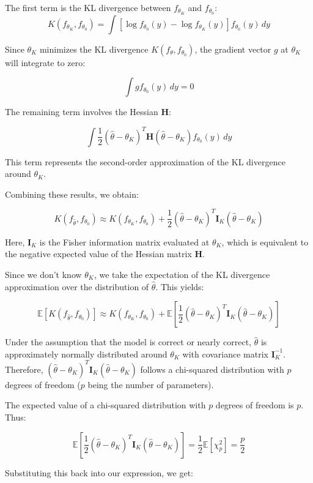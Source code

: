 \documentclass[
11pt, %
oneside, %
english, %
singlespacing, %
]{macthesis} %
\begin{document}
The first term is the KL divergence between \(f_{\theta_K}\) and \(f_{\theta_0}\):
\[
K(f_{\theta_K}, f_{\theta_0}) = \int \left[ \log{f_{\theta_0}(y)} - \log{f_{\theta_K}(y)} \right] f_{\theta_0}(y) \, dy
\]

Since \(\theta_K\) minimizes the KL divergence \(K(f_\theta, f_{\theta_0})\), the gradient vector \(g\) at \(\theta_K\) will integrate to zero:

\[
\int g f_{\theta_0}(y) \, dy = 0
\]

The remaining term involves the Hessian \(\mathbf{H}\):

\[
\int \frac{1}{2} (\hat{\theta} - \theta_K)^T \mathbf{H} (\hat{\theta} - \theta_K) f_{\theta_0}(y) \, dy
\]

This term represents the second-order approximation of the KL divergence around \(\theta_K\).

Combining these results, we obtain:

\[
K(f_{\hat{\theta}}, f_{\theta_0}) \approx K(f_{\theta_K}, f_{\theta_0}) + \frac{1}{2} (\hat{\theta} - \theta_K)^T \mathbf{I}_K (\hat{\theta} - \theta_K) 
\]

Here, \(\mathbf{I}_K\) is the Fisher information matrix evaluated at \(\theta_K\), which is equivalent to the negative expected value of the Hessian matrix \(\mathbf{H}\).

Since we don't know \(\theta_K\), we take the expectation of the KL divergence approximation over the distribution of \(\hat{\theta}\). This yields:

\[
\mathbb{E}[K(f_{\hat{\theta}}, f_{\theta_0})] \approx K(f_{\theta_K}, f_{\theta_0}) + \mathbb{E}\left[\frac{1}{2} (\hat{\theta} - \theta_K)^T \mathbf{I}_K (\hat{\theta} - \theta_K)\right]
\]

Under the assumption that the model is correct or nearly correct, \(\hat{\theta}\) is approximately normally distributed around \(\theta_K\) with covariance matrix \(\mathbf{I}_K^{-1}\). Therefore, \((\hat{\theta} - \theta_K)^T \mathbf{I}_K (\hat{\theta} - \theta_K)\) follows a chi-squared distribution with \(p\) degrees of freedom (\(p\) being the number of parameters).

The expected value of a chi-squared distribution with \(p\) degrees of freedom is \(p\). Thus:

\[
\mathbb{E}\left[\frac{1}{2} (\hat{\theta} - \theta_K)^T \mathbf{I}_K (\hat{\theta} - \theta_K)\right] = \frac{1}{2} \mathbb{E}[\chi^2_p] = \frac{p}{2}
\]

Substituting this back into our expression, we get:
\end{document}
